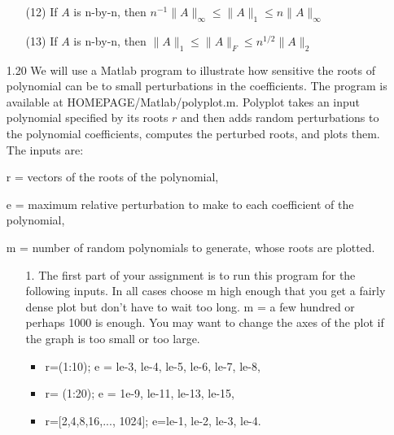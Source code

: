\documentclass[12pt,letterpaper,reqno]{amsart}
\begin{document}
\begin{enumerate}
\begin{enumerate}
\begin{flushleft}
    \end{flushleft}
    \item[(12)] If $  A  $ is n-by-n, then $  n^{-1}\|A\|_{\infty} \leq\|A\|_{1} \leq n\|A\|_{\infty} $
    \begin{flushleft}

    \end{flushleft}
    \item[(13)] If $  A  $ is n-by-n, then $ \|A\|_{1} \leq\|A\|_{F} \leq n^{1 / 2}\|A\|_{2} $
    \begin{flushleft}

    \end{flushleft}
\end{enumerate}
\item[1.20] We will use a Matlab program to illustrate how sensitive the roots of polynomial can be to small perturbations in the coefficients. The program is available at HOMEPAGE/Matlab/polyplot.m. Polyplot takes an input polynomial specified by its roots $r$ and then adds random perturbations to the polynomial coefficients, computes the perturbed roots, and plots them. The inputs are:\newline

\quad r = vectors of the roots of the polynomial,

\quad e = maximum relative perturbation to make to each coefficient of the polynomial,

\quad m = number of random polynomials to generate, whose roots are
plotted. \newline
\begin{enumerate}
    \item[1.] The first part of your assignment is to run this program for the following inputs. In all cases choose m high enough that you get a fairly dense plot but don't have to wait too long. m = a few hundred or perhaps 1000 is enough. You may want to change the axes of the plot if the graph is too small or too large.
    \begin{itemize}
        \item r=(1:10); e = le-3, le-4, le-5, le-6, le-7, le-8,
        \begin{flushleft}

        \end{flushleft}
        \item r= (1:20); e = 1e-9, le-11, le-13, le-15,
        \begin{flushleft}

        \end{flushleft}
        \item r=[2,4,8,16,..., 1024]; e=le-1, le-2, le-3, le-4.
        \begin{flushleft}


\end{flushleft}
\end{itemize}
\end{enumerate}
\end{enumerate}
\end{document}

